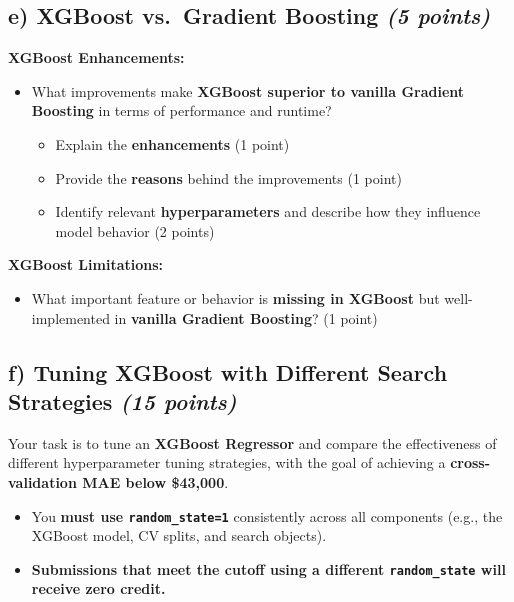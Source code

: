 \documentclass[
  letterpaper,
  DIV=11,
  numbers=noendperiod]{scrreprt}
\providecommand{\tightlist}{%
  \setlength{\itemsep}{0pt}\setlength{\parskip}{0pt}}\usepackage{longtable,booktabs,array}
\begin{document}
\subsection{\texorpdfstring{e) XGBoost vs.~Gradient Boosting \emph{(5
points)}}{e) XGBoost vs.~Gradient Boosting (5 points)}}\label{e-xgboost-vs.-gradient-boosting-5-points}

\textbf{XGBoost Enhancements:}

\begin{itemize}
\tightlist
\item
  What improvements make \textbf{XGBoost superior to vanilla Gradient
  Boosting} in terms of performance and runtime?

  \begin{itemize}
  \tightlist
  \item
    Explain the \textbf{enhancements} (1 point)\\
  \item
    Provide the \textbf{reasons} behind the improvements (1 point)\\
  \item
    Identify relevant \textbf{hyperparameters} and describe how they
    influence model behavior (2 points)
  \end{itemize}
\end{itemize}

\textbf{XGBoost Limitations:}

\begin{itemize}
\tightlist
\item
  What important feature or behavior is \textbf{missing in XGBoost} but
  well-implemented in \textbf{vanilla Gradient Boosting}? (1 point)
\end{itemize}

\subsection{\texorpdfstring{f) Tuning XGBoost with Different Search
Strategies \emph{(15
points)}}{f) Tuning XGBoost with Different Search Strategies (15 points)}}\label{f-tuning-xgboost-with-different-search-strategies-15-points}

Your task is to tune an \textbf{XGBoost Regressor} and compare the
effectiveness of different hyperparameter tuning strategies, with the
goal of achieving a \textbf{cross-validation MAE below \$43,000}.

\begin{itemize}
\tightlist
\item
  You \textbf{must use \texttt{random\_state=1}} consistently across all
  components (e.g., the XGBoost model, CV splits, and search objects).\\
\item
  \textbf{Submissions that meet the cutoff using a different
  \texttt{random\_state} will receive zero credit.}
\end{itemize}
\end{document}
